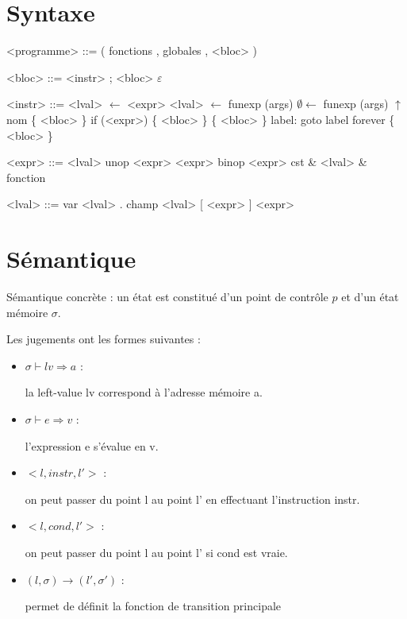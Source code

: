 \documentclass{article}
\begin{document}
\section{Syntaxe}

\begin{grammar}
<programme> ::= ( fonctions , globales , <bloc> )

     <bloc> ::= <instr> ; <bloc>
           \alt $ε$

    <instr> ::= <lval> $←$ <expr>
           \alt <lval> $←$ funexp (args)
           \alt  $∅ ←$ funexp (args)
           \alt $↑$ nom \{ <bloc> \}
           \alt if (<expr>) \{ <bloc> \}
           \alt \{ <bloc> \} label:
           \alt goto label
           \alt forever \{ <bloc> \}

    <expr> ::= <lval>
          \alt unop <expr>
          \alt <expr> binop <expr>
          \alt cst
          \alt \& <lval>
          \alt \& fonction

    <lval> ::= var
          \alt <lval> . champ
          \alt <lval> [ <expr> ]
          \alt * <expr>

\end{grammar}

\section{Sémantique}

Sémantique concrète : un état est constitué d'un point de contrôle $p$ et d'un
état mémoire $σ$.

Les jugements ont les formes suivantes :

\begin{itemize}

\item $σ ⊢ lv ⇒ a$ :

  la left-value lv correspond à l'adresse mémoire a.

\item $σ ⊢ e ⇒ v$ :

  l'expression e s'évalue en v.

\item $<l, instr, l'>$ :

  on peut passer du point l au point l' en effectuant
  l'instruction instr.

\item $<l, cond, l'>$ :

  on peut passer du point l au point l' si cond est vraie.

\item $(l, σ) → (l', σ')$ :

  permet de définit la fonction de transition principale

\end{itemize}
\end{document}
